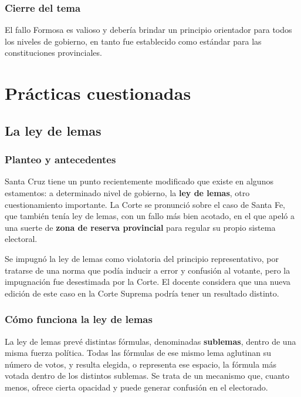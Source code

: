 \documentclass[12pt,oneside]{book}
\begin{document}
\subsection{Cierre del tema}

El fallo Formosa es valioso y debería brindar un principio orientador para todos los niveles de gobierno, en tanto fue establecido como estándar para las constituciones provinciales.

\chapter[Prácticas cuestionadas]{Prácticas cuestionadas}

\section{La ley de lemas}

\subsection{Planteo y antecedentes}

Santa Cruz tiene un punto recientemente modificado que existe en algunos estamentos: a determinado nivel de gobierno, la \textbf{ley de lemas}, otro cuestionamiento importante. La Corte se pronunció sobre el caso de Santa Fe, que también tenía ley de lemas, con un fallo más bien acotado, en el que apeló a una suerte de \textbf{zona de reserva provincial} para regular su propio sistema electoral.

Se impugnó la ley de lemas como violatoria del principio representativo, por tratarse de una norma que podía inducir a error y confusión al votante, pero la impugnación fue desestimada por la Corte. El docente considera que una nueva edición de este caso en la Corte Suprema podría tener un resultado distinto.

\subsection{Cómo funciona la ley de lemas}

La ley de lemas prevé distintas fórmulas, denominadas \textbf{sublemas}, dentro de una misma fuerza política. Todas las fórmulas de ese mismo lema aglutinan su número de votos, y resulta elegida, o representa ese espacio, la fórmula más votada dentro de los distintos sublemas. Se trata de un mecanismo que, cuanto menos, ofrece cierta opacidad y puede generar confusión en el electorado.
\end{document}
